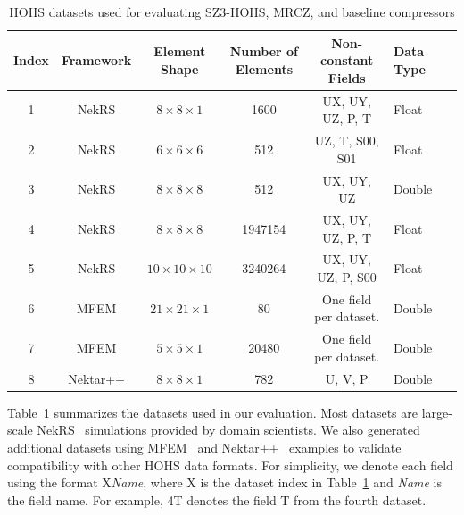 \begin{table}[htb]
    \centering
    \caption{HOHS datasets used for evaluating SZ3-HOHS, MRCZ, and baseline compressors}
    \label{tab:datasets}
    \begin{tabular}{c|cccclc}\toprule
         \textbf{Index} & \textbf{Framework} & \textbf{Element Shape} & \textbf{Number of Elements} & \textbf{Non-constant Fields} & \textbf{Data Type} \\
         \midrule
         1              & NekRS              & $8\times8\times1$      & 1600                        & UX, UY, UZ, P, T             & Float \\
         2              & NekRS              & $6\times6\times6$      & 512                         & UZ, T, S00, S01              & Float \\
         3              & NekRS              & $8\times8\times8$      & 512                         & UX, UY, UZ                   & Double \\
         4              & NekRS              & $8\times8\times8$      & 1947154                     & UX, UY, UZ, P, T             & Float \\
         5              & NekRS              & $10\times10\times10$   & 3240264                     & UX, UY, UZ, P, S00           & Float \\
         6              & MFEM               & $21\times21\times1$    & 80                          & One field per dataset.       & Double \\
         7              & MFEM               & $5\times5\times1$      & 20480                       & One field per dataset.       & Double\\
         8              & Nektar++           & $8\times8\times1$      & 782                         & U, V, P                      & Double\\\bottomrule
    \end{tabular}
\end{table}

Table~\ref{tab:datasets} summarizes the datasets used in our evaluation. Most datasets are large-scale NekRS~\cite{fischer2022nekrs} simulations provided by domain scientists. We also generated additional datasets using MFEM~\cite{kolev2010modular} and Nektar++~\cite{moxey2020nektar++} examples to validate compatibility with other HOHS data formats. For simplicity, we denote each field using the format X\textit{Name}, where X is the dataset index in Table~\ref{tab:datasets} and \textit{Name} is the field name. For example, 4T denotes the field T from the fourth dataset.

